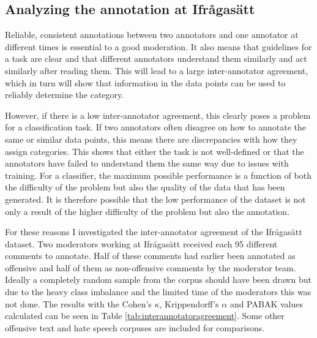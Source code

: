 \documentclass[nofilelist]{cslthse-msc}
\begin{document}
\subsection{Analyzing the annotation at Ifrågasätt}

Reliable, consistent annotations between two annotators and one annotator at different times is essential to a good moderation. It also means that guidelines for a task are clear and that different annotators understand them similarly and act similarly after reading them. This will lead to a large inter-annotator agreement, which in turn will show that information in the data points can be used to reliably determine the category. 

However, if there is a low inter-annotator agreement, this clearly poses a problem for a classification task. If two annotators often disagree on how to annotate the same or similar data points, this means there are discrepancies with how they assign categories. This shows that either the task is not well-defined or that the annotators have failed to understand them the same way due to issues with training. For a classifier, the maximum possible performance is a function of both the difficulty of the problem but also the quality of the data that has been generated. It is therefore possible that the low performance of the dataset is not only a result of the higher difficulty of the problem but also the annotation.

For these reasons I investigated the inter-annotator agreement of the Ifrågasätt dataset. Two moderators working at Ifrågasätt received each 95 different comments to annotate. Half of these comments had earlier been annotated as offensive and half of them as non-offensive comments by the moderator team. Ideally a completely random sample from the corpus should have been drawn but due to the heavy class imbalance and the limited time of the moderators this was not done. The results with the Cohen's $\kappa$, Krippendorff's $\alpha$ and PABAK values calculated can be seen in Table \ref{tab:interannotatoragreement}. Some other offensive text and hate speech corpuses are included for comparisons.
\end{document}
